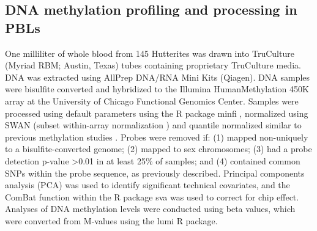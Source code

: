 \subsection{DNA methylation profiling and processing in PBLs}\label{DNA methylation profiling and processing in PBLs}
One milliliter of whole blood from 145 Hutterites was drawn into TruCulture (Myriad RBM; Austin, Texas) tubes containing proprietary TruCulture media. DNA was extracted using AllPrep DNA/RNA Mini Kits (Qiagen). DNA samples were bisulfite converted and hybridized to the Illumina HumanMethylation 450K array at the University of Chicago Functional Genomics Center.  Samples were processed using default parameters using the R package minfi \citep{Aryee:2014by}, normalized using SWAN (subset within-array normalization \citep{Maksimovic:2012ib}) and quantile normalized similar to previous methylation studies \citep{NicodemusJohnson:2016go}.  Probes were removed if: (1) mapped non-uniquely to a bisulfite-converted genome; (2) mapped to sex chromosomes; (3) had a probe detection p-value >0.01 in at least 25\% of samples; and (4) contained common SNPs within the probe sequence, as previously described\citep{Banovich:2014bn}. Principal components analysis (PCA) was used to identify significant technical covariates, and the ComBat function \citep{Johnson:2007fp} within the R package sva \citep{Leek:2012ee} was used to correct for chip effect. Analyses of DNA methylation levels were conducted using beta values, which were converted from M-values using the lumi R package\citep{Du:2008ev}.













